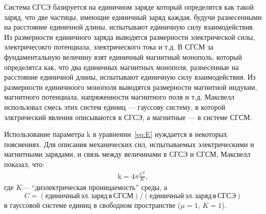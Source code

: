 \documentclass[12pt, oneside, a4paper]{article}
\begin{document}
Система СГСЭ базируется на единичном заряде который определятся как такой заряд, что две частицы, имеющие единичный заряд каждая, будучи разнесенными на расстояние единичной длины, испытывают единичную силу взаимодействия. Из размерности единичного заряда выводятся размерности электрической силы, электричесокго потенциала, электрического тока и т.д. В СГСМ за фундаментальную величину взят единичный магнитный монополь, который определятса как, что два единичных магнитных монополя, разнесенные на расстояние единичной длины, испытывают единичную силу взаимодействия. Из размерности единичноого монополя выводятся размерности магнитной индукии, магнитного потенциала, напряженности магнитного поля и т.д. Максвелл использовал смесь этих систем единиц --- гауссову систему, в которой элктрический явления описываются в СГСЭ, а магнитные --- в системе СГСМ.

Использование параметра $\mathrm{k}$ в уравненни~\eqref{eq:E} нуждается в некоторых пояснениях. Для описания механических сил, испытываемых электрическими и магнитными зарядами, и связь между величинами в СГСЭ и СГСМ, Максвелл показал, что:\begin{align}
\mathrm{k}=4\pi\frac{C^2}{K},\label{eq:5.1}
\end{align}
где $K$--- ``диэлектрическая проницаемость'' среды, а
\[
C=(единичный\,эл.\,заряд\,в\,СГСМ)/(единичный\,эл.\,заряд\,в\,СГСЭ)
\]
в гауссовой системе единиц в свободном пространстве ($\mu=1$, $K=1$).
\end{document}
